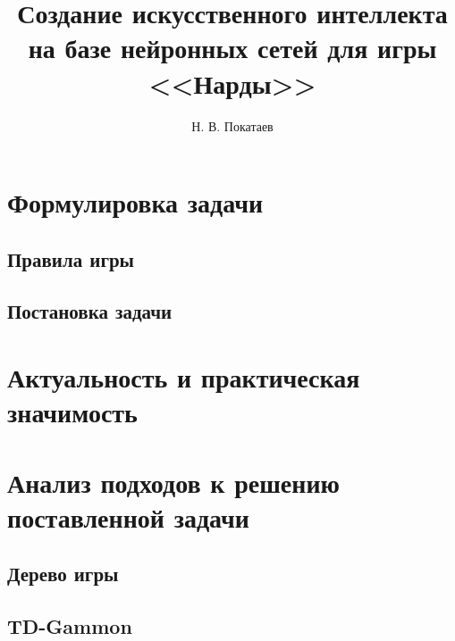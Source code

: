 \documentclass{vsciwork}
\title{Создание искусственного интеллекта на базе нейронных сетей для игры <<Нарды>>}
\author{Н. В. Покатаев}
\begin{document}
\maketitle

\tableofcontents



\section{Формулировка задачи}


\subsection{Правила игры}


\subsection{Постановка задачи}


\section{Актуальность и практическая значимость}


\section{Анализ подходов к решению поставленной задачи}

\subsection{Дерево игры}


\subsection{TD-Gammon}





\end{document}
